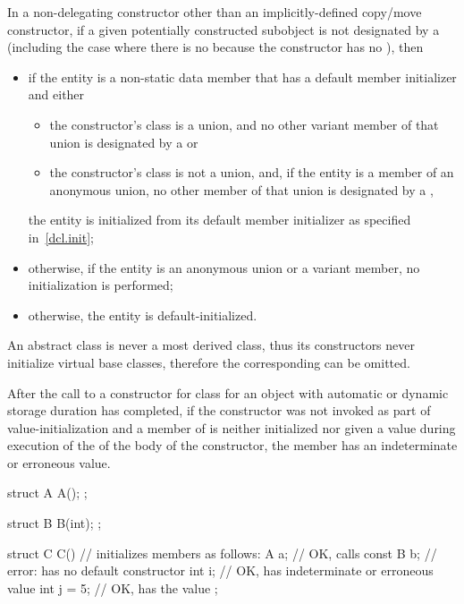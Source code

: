 \pnum
In a non-delegating constructor
other than an implicitly-defined copy/move constructor,
if a given potentially constructed subobject is not designated by a
(including the case where there is no
because the constructor has no
),
then
\begin{itemize}
\item if the entity is a non-static data member that has
a default member initializer and either
\begin{itemize}
\item the constructor's class is a union, and no other variant
member of that union is designated by a  or

\item the constructor's class is not a union, and, if the entity is a member of an
anonymous union, no other member of that union is designated by a
,
\end{itemize}
the entity is initialized from its default member initializer
as specified in~\ref{dcl.init};

\item otherwise, if the entity is an anonymous union or a variant member, no initialization is performed;

\item otherwise, the entity is default-initialized.
\end{itemize}

\begin{note}
An abstract class is never a most derived
class, thus its constructors never initialize virtual base classes, therefore the
corresponding  can be omitted.
\end{note}
%
%
\begin{note}
After the call to a constructor for class
for an object with automatic or dynamic storage duration
has completed, if
the constructor was not invoked as part of value-initialization and
a member of
is neither initialized nor
given a value
during execution of the  of the body of the constructor,
the member has an indeterminate or erroneous value.
\end{note}
\begin{example}
\begin{codeblock}
struct A {
  A();
};

struct B {
  B(int);
};

struct C {
  C() { }               // initializes members as follows:
  A a;                  // OK, calls 
  const B b;            // error:  has no default constructor
  int i;                // OK,  has indeterminate or erroneous value
  int j = 5;            // OK,  has the value 
};
\end{codeblock}
\end{example}

